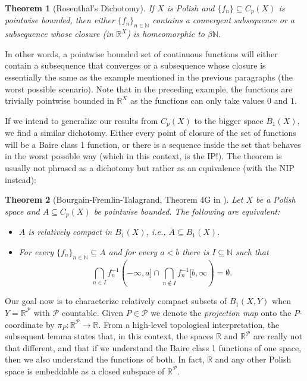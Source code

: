 \documentclass[psamsfonts]{amsart}
\newtheorem{thm}{Theorem}[section]
\theoremstyle{definition}
\theoremstyle{remark}
\numberwithin{equation}{section}
\begin{document}
\begin{thm}[Rosenthal's Dichotomy]
    If $X$ is Polish and $\{f_n\}\subseteq C_p(X)$ is pointwise bounded, then either $\{f_n\}_{n\in\mathbb N}$ contains a convergent subsequence or a subsequence whose closure (in $\mathbb R^X$) is homeomorphic to $\beta\mathbb N$.
\end{thm}

In other words, a pointwise bounded set of continuous functions will either contain a subsequence that converges or a subsequence whose closure is essentially the same as the example mentioned in the previous paragraphs (the worst possible scenario). Note that in the preceding example, the functions are trivially pointwise bounded in $\mathbb R^X$ as the functions can only take values $0$ and $1$.

If we intend to generalize our results from $C_p(X)$ to the bigger space $B_1(X)$, we find a similar dichotomy. Either every point of closure of the set of functions will be a Baire class 1 function, or there is a sequence inside the set that behaves in the worst possible way (which in this context, is the IP!). The theorem is usually not phrased as a dichotomy but rather as an equivalence (with the NIP instead):

\begin{thm}[Bourgain-Fremlin-Talagrand, Theorem 4G in \cite{BFT_1978_PCompactBaire}]\label{BFT}
    Let $X$ be a Polish space and $A\subseteq C_p(X)$ be pointwise bounded. The following are equivalent:
    \begin{itemize}
        \item [(i)] $A$ is relatively compact in $B_1(X)$, i.e., $\overline{A}\subseteq B_1(X)$.
        \item [(ii)] For every $\{f_n\}_{n\in\mathbb N}\subseteq A$ and for every $a<b$ there is $I\subseteq\mathbb{N}$ such that
$$\bigcap_{n\in I}f_n^{-1}(-\infty,a]\cap\bigcap_{n\notin I}f_n^{-1}[b,\infty)=\emptyset.$$
    \end{itemize}
\end{thm}

Our goal now is to characterize relatively compact subsets of $B_1(X,Y)$ when $Y=\mathbb{R}^\mathcal{P}$ with $\mathcal{P}$ countable. Given $P\in\mathcal{P}$ we denote the \emph{projection map} onto the $P$-coordinate by $\pi_P:\mathbb{R}^\mathcal{P}\rightarrow\mathbb{R}$. From a high-level topological interpretation, the subsequent lemma states that, in this context, the spaces $\mathbb R$ and $\mathbb R^\mathcal P$ are really not that different, and that if we understand the Baire class 1 functions of one space, then we also understand the functions of both. In fact, $\mathbb R$ and any other Polish space is embeddable as a closed subspace of $\mathbb R^\mathcal P$.
\end{document}

